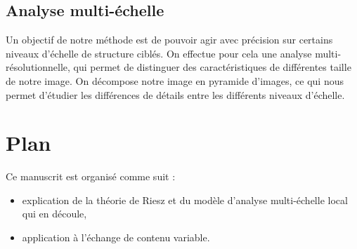 \subsection*{Analyse multi-échelle}

Un objectif de notre méthode est de pouvoir agir avec précision sur certains niveaux d'échelle de structure ciblés. On effectue pour cela une analyse multi-résolutionnelle, qui permet de distinguer des caractéristiques de différentes taille de notre image. On décompose notre image en pyramide d'images, ce qui nous permet d'étudier les différences de détails entre les différents niveaux d'échelle.

\section{Plan} %

Ce manuscrit est organisé comme suit :

\begin{itemize}
    \item explication de la théorie de Riesz et du modèle d'analyse multi-échelle local qui en découle,
    \item application à l'échange de contenu variable.
\end{itemize}